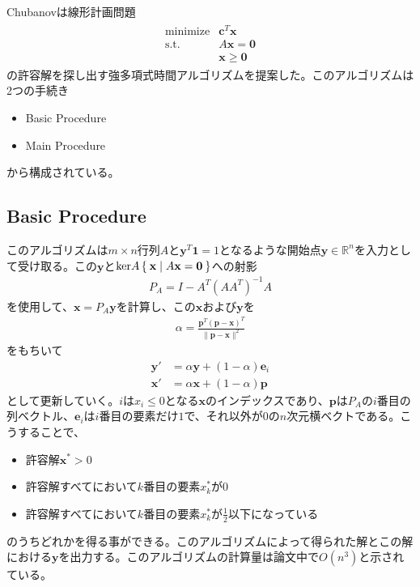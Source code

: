 Chubanovは線形計画問題
\begin{align*}
  \begin{array}{ll}
    \text{minimize} & \mathbf{c}^T \mathbf{x} \\
    \text{s.t.}     & A \mathbf{x} = \mathbf{0} \\
                    & \mathbf{x} \geq \mathbf{0}
  \end{array}
\end{align*}
の許容解を探し出す強多項式時間アルゴリズムを提案した。このアルゴリズムは2つの手続き
\begin{itemize}
  \item Basic Procedure
  \item Main Procedure
\end{itemize}
から構成されている。

\subsection{Basic Procedure}
このアルゴリズムは$m \times n$行列$A$と$\mathbf{y}^T \mathbf{1} = 1$となるような開始点$\mathbf{y} \in \mathbb{R}^n$を入力として受け取る。この$\mathbf{y}$と$\mathrm{ker}A \Set{\mathbf{x} | A \mathbf{x} = \mathbf{0}}$への射影
\begin{align*}
  P_A = I - A^T \left(A A^T\right)^{-1} A
\end{align*}
を使用して、$\mathbf{x} = P_A \mathbf{y}$を計算し、この$\mathbf{x}$および$\mathbf{y}$を
\begin{align*}
  \alpha = \frac{\mathbf{p}^T \left(\mathbf{p} - \mathbf{x}\right)^T}{\|\mathbf{p} - \mathbf{x}\|^2}
\end{align*}
をもちいて
\begin{align*}
  \mathbf{y}' & = \alpha \mathbf{y} + \left(1 - \alpha\right) \mathbf{e}_i \\
  \mathbf{x}' & = \alpha \mathbf{x} + \left(1 - \alpha\right) \mathbf{p}
\end{align*}
として更新していく。$i$は$x_i \leq 0$となる$\mathbf{x}$のインデックスであり、$\mathbf{p}$は$P_A$の$i$番目の列ベクトル、$\mathbf{e}_i$は$i$番目の要素だけ$1$で、それ以外が$0$の$n$次元横ベクトである。こうすることで、
\begin{itemize}
  \item 許容解$\mathbf{x}^* > 0$
  \item 許容解すべてにおいて$k$番目の要素$x_k^*$が$0$
  \item 許容解すべてにおいて$k$番目の要素$x_k^*$が$\frac{1}{2}$以下になっている
\end{itemize}
のうちどれかを得る事ができる。このアルゴリズムによって得られた解とこの解における$\mathbf{y}$を出力する。このアルゴリズムの計算量は論文中\cite{Chubanov}で$O(n^3)$と示されている。

